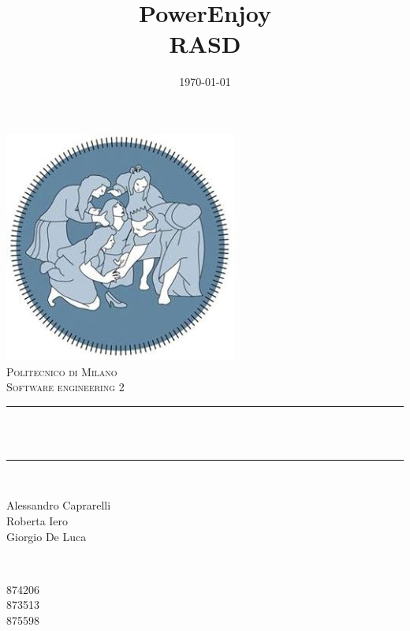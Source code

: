 \documentclass[12pt]{report}
\title{PowerEnjoy\\RASD}                             %
\date{\today}                                           %
\makeatletter
\let\thetitle\@title
\let\thedate\@date
\makeatother
\begin{document}

\begin{titlepage}
    \centering
    \vspace*{0.5 cm}
    \includegraphics[scale = 0.75]{images/poli.jpg}\\[1.0 cm]   %
    \textsc{\LARGE Politecnico di Milano}\\[2.0 cm]   %
    \textsc{\large Software engineering 2}\\[0.5 cm]               %
    \rule{\linewidth}{0.2 mm} \\[0.4 cm]
    { \huge \bfseries \thetitle}\\
    \rule{\linewidth}{0.2 mm} \\[1.5 cm]
    
    \begin{minipage}{0.4\textwidth}
        \begin{flushleft} \large
            Alessandro Caprarelli \\
	 Roberta Iero \\
	 Giorgio De Luca
	
            \end{flushleft}
            \end{minipage}~ 
            \begin{minipage}{0.4\textwidth}
            \begin{flushright} \large
            874206  \\
            873513 \\
            875598
        \end{flushright}
    \end{minipage}\\[2 cm]
    
    {\large \thedate}\\[2 cm]
 
    \vfill
    
\end{titlepage}


\tableofcontents
\pagebreak






\end{document}

